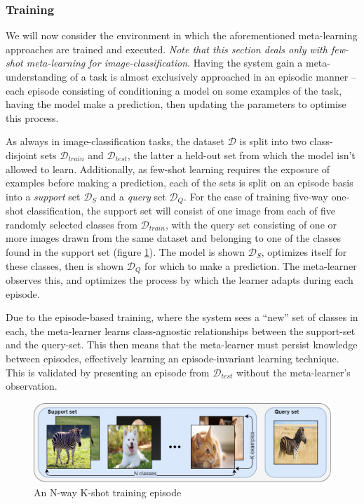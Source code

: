 \documentclass{report}
\begin{document}
\subsubsection{Training}
We will now consider the environment in which the aforementioned meta-learning approaches are trained and executed. \textit{Note that this section deals only with few-shot meta-learning for image-classification}. Having the system gain a meta-understanding of a task is almost exclusively approached in an episodic manner -- each episode consisting of conditioning a model on some examples of the task, having the model make a prediction, then updating the parameters to optimise this process. \par
As always in image-classification tasks, the dataset $\mathcal{D}$ is split into two class-disjoint sets $\mathcal{D}_{train}$ and $\mathcal{D}_{test}$, the latter a held-out set from which the model isn't allowed to learn. Additionally, as few-shot learning requires the exposure of examples before making a prediction, each of the sets is split on an episode basis into a \textit{support} set $\mathcal{D}_{S}$ and a \textit{query} set $\mathcal{D}_{Q}$. For the case of training five-way one-shot classification, the support set will consist of one image from each of five randomly selected classes from $\mathcal{D}_{train}$, with the query set consisting of one or more images drawn from the same dataset and belonging to one of the classes found in the support set (figure \ref{fig:episode:1}). The model is shown $\mathcal{D}_S$, optimizes itself for these classes, then is shown $\mathcal{D}_Q$ for which to make a prediction. The meta-learner observes this, and optimizes the process by which the learner adapts during each episode. \par
Due to the episode-based training, where the system sees a ``new'' set of classes in each, the meta-learner learns class-agnostic relationships between the support-set and the query-set. This then means that the meta-learner must persist knowledge between episodes, effectively learning an episode-invariant learning technique. This is validated by presenting an episode from $\mathcal{D}_{test}$ without the meta-learner's observation. \par
\begin{figure}[!h]
 \centering
 \includegraphics[width=14cm]{episode}
 \caption{An N-way K-shot training episode}
 \label{fig:episode:1}
\end{figure}
\end{document}
